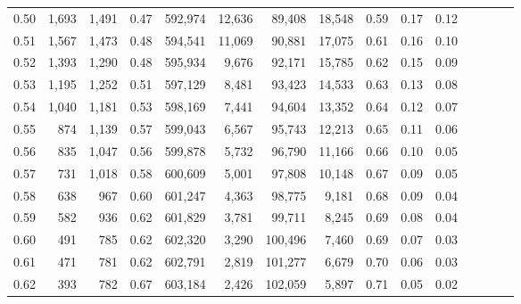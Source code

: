 \begin{tabular}{rrrcrrrrrrrrrrr}
0.50 &   1,693 &  1,491 &                                       0.47 &  592,974 &   12,636 &   89,408 &   18,548 &  0.59 &  0.17 &                         0.12 \\
0.51 &   1,567 &  1,473 &                                       0.48 &  594,541 &   11,069 &   90,881 &   17,075 &  0.61 &  0.16 &                         0.10 \\
0.52 &   1,393 &  1,290 &                                       0.48 &  595,934 &    9,676 &   92,171 &   15,785 &  0.62 &  0.15 &                         0.09 \\
0.53 &   1,195 &  1,252 &                                       0.51 &  597,129 &    8,481 &   93,423 &   14,533 &  0.63 &  0.13 &                         0.08 \\
0.54 &   1,040 &  1,181 &                                       0.53 &  598,169 &    7,441 &   94,604 &   13,352 &  0.64 &  0.12 &                         0.07 \\
0.55 &     874 &  1,139 &                                       0.57 &  599,043 &    6,567 &   95,743 &   12,213 &  0.65 &  0.11 &                         0.06 \\
0.56 &     835 &  1,047 &                                       0.56 &  599,878 &    5,732 &   96,790 &   11,166 &  0.66 &  0.10 &                         0.05 \\
0.57 &     731 &  1,018 &                                       0.58 &  600,609 &    5,001 &   97,808 &   10,148 &  0.67 &  0.09 &                         0.05 \\
0.58 &     638 &    967 &                                       0.60 &  601,247 &    4,363 &   98,775 &    9,181 &  0.68 &  0.09 &                         0.04 \\
0.59 &     582 &    936 &                                       0.62 &  601,829 &    3,781 &   99,711 &    8,245 &  0.69 &  0.08 &                         0.04 \\
0.60 &     491 &    785 &                                       0.62 &  602,320 &    3,290 &  100,496 &    7,460 &  0.69 &  0.07 &                         0.03 \\
0.61 &     471 &    781 &                                       0.62 &  602,791 &    2,819 &  101,277 &    6,679 &  0.70 &  0.06 &                         0.03 \\
0.62 &     393 &    782 &                                       0.67 &  603,184 &    2,426 &  102,059 &    5,897 &  0.71 &  0.05 &                         0.02 \\

\end{tabular}
